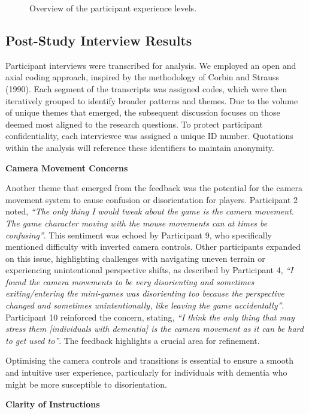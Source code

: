 \documentclass{l4proj}
\begin{document}
\begin{figure}[h]
  \caption{Overview of the participant experience levels.}  
  \label{fig:participant_experience} 
\end{figure}


\subsection{Post-Study Interview Results}
Participant interviews were transcribed for analysis. We employed an open and axial coding approach, inspired by the methodology of Corbin and Strauss (1990).  Each segment of the transcripts was assigned codes, which were then iteratively grouped to identify broader patterns and themes. Due to the volume of unique themes that emerged, the subsequent discussion focuses on those deemed most aligned to the research questions. To protect participant confidentiality, each interviewee was assigned a unique ID number. Quotations within the analysis will reference these identifiers to maintain anonymity.
\newline

\textbf{Camera Movement Concerns}

Another theme that emerged from the feedback was the potential for the camera movement system to cause confusion or disorientation for players. Participant 2 noted, \emph{“The only thing I would tweak about the game is the camera movement. The game character moving with the mouse movements can at times be confusing”}. This sentiment was echoed by Participant 9, who specifically mentioned difficulty with inverted camera controls. Other participants expanded on this issue, highlighting challenges with navigating uneven terrain or experiencing unintentional perspective shifts, as described by Participant 4, \emph{“I found the camera movements to be very disorienting and sometimes exiting/entering the mini-games was disorienting too because the perspective changed and sometimes unintentionally, like leaving the game accidentally”}. Participant 10 reinforced the concern, stating, \emph{“I think the only thing that may stress them [individuals with dementia] is the camera movement as it can be hard to get used to”}. The feedback highlights a crucial area for refinement. 

Optimising the camera controls and transitions is essential to ensure a smooth and intuitive user experience, particularly for individuals with dementia who might be more susceptible to disorientation.
\newline

\textbf{Clarity of Instructions}
\end{document}
